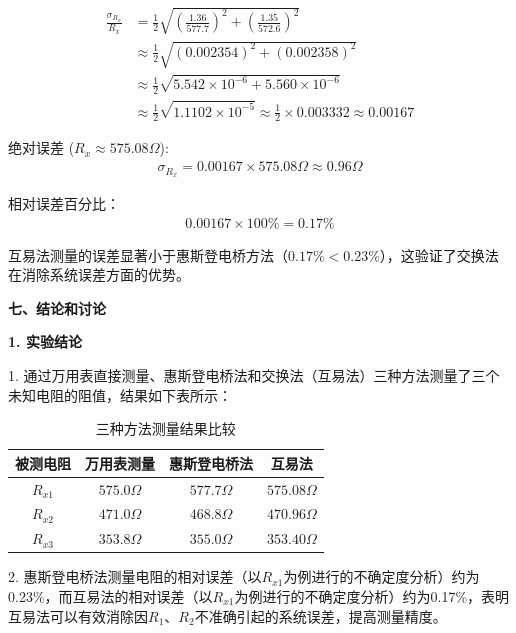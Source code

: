 ﻿\documentclass[12pt,a4paper]{article}
\begin{document}
\begin{align}
    \frac{\sigma_{R_x}}{R_x} &= \frac{1}{2}\sqrt{\left(\frac{1.36}{577.7}\right)^2 + \left(\frac{1.35}{572.6}\right)^2} \\ %
    &\approx \frac{1}{2}\sqrt{(0.002354)^2 + (0.002358)^2} \\ %
    &\approx \frac{1}{2}\sqrt{5.542 \times 10^{-6} + 5.560 \times 10^{-6}} \\ %
    &\approx \frac{1}{2}\sqrt{1.1102 \times 10^{-5}} \approx \frac{1}{2} \times 0.003332 \approx 0.00167 %
\end{align}

绝对误差 ($R_x \approx 575.08\Omega$):
\begin{align}
    \sigma_{R_x} = 0.00167 \times 575.08\Omega \approx 0.96\Omega %
\end{align}

相对误差百分比：
\begin{align}
    0.00167 \times 100\% = 0.17\%
\end{align}

互易法测量的误差显著小于惠斯登电桥方法（$0.17\% < 0.23\%$），这验证了交换法在消除系统误差方面的优势。

\textbf{七、结论和讨论}

\textbf{1. 实验结论}

1. 通过万用表直接测量、惠斯登电桥法和交换法（互易法）三种方法测量了三个未知电阻的阻值，结果如下表所示：

\begin{table}[H]
    \centering
    \begin{tabular}{|c|c|c|c|}
        \hline
        被测电阻 & 万用表测量 & 惠斯登电桥法 & 互易法 \\
        \hline
        $R_{x1}$ & $575.0\Omega$ & $577.7\Omega$ & $575.08\Omega$ \\ %
        \hline
        $R_{x2}$ & $471.0\Omega$ & $468.8\Omega$ & $470.96\Omega$ \\ %
        \hline
        $R_{x3}$ & $353.8\Omega$ & $355.0\Omega$ & $353.40\Omega$ \\ %
        \hline
    \end{tabular}
    \caption{三种方法测量结果比较}
    \label{tab:comparison}
\end{table}

2. 惠斯登电桥法测量电阻的相对误差（以$R_{x1}$为例进行的不确定度分析）约为0.23\%，而互易法的相对误差（以$R_{x1}$为例进行的不确定度分析）约为0.17\%，表明互易法可以有效消除因$R_1$、$R_2$不准确引起的系统误差，提高测量精度。
\end{document}

